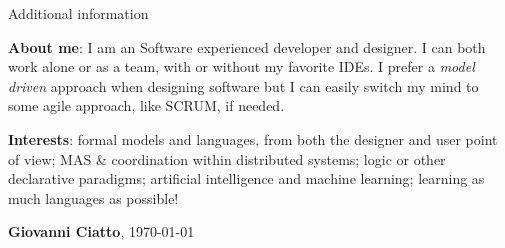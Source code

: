 \documentclass{resume} %
\begin{document}

\begin{rSection}{Additional information}

\item \textbf{About me}: I am an Software experienced developer and designer. 
I can both work alone or as a team, with or without my favorite IDEs. 
I prefer a \emph{model driven} approach when designing software but I can easily switch my mind to some agile approach, like SCRUM, if needed.

\item \textbf{Interests}: formal models and languages, from both the designer and user point of view; MAS \& coordination within distributed systems; logic or other declarative paradigms; artificial intelligence and machine learning; learning as much languages as possible!
\end{rSection}

\begin{flushright}
	\textbf{Giovanni Ciatto}, \today
	
\end{flushright}
\end{document}
